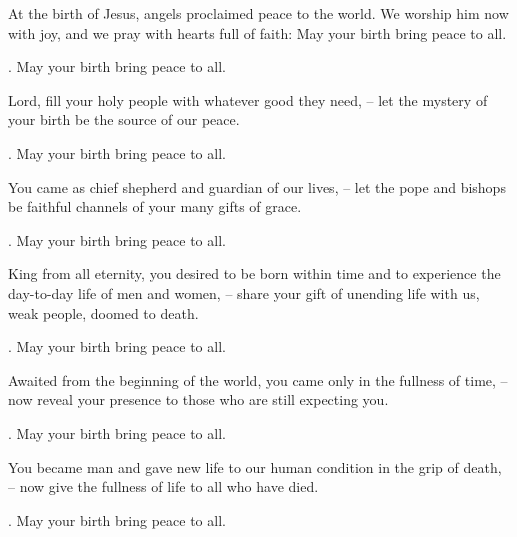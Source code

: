 \lettrine[loversize=0.15,lines=2]{A}{}t the birth of Jesus, angels proclaimed peace to the world. We worship him now with joy, and we pray with hearts full of faith: May your birth bring peace to all.
\par \Rbar. May your birth bring peace to all.

Lord, fill your holy people with whatever good they need,
– let the mystery of your birth be the source of our peace.
\par \Rbar. May your birth bring peace to all.

You came as chief shepherd and guardian of our lives,
– let the pope and bishops be faithful channels of your many gifts of grace.
\par \Rbar. May your birth bring peace to all.

King from all eternity, you desired to be born within time and to experience the day-to-day life of men and women,
– share your gift of unending life with us, weak people, doomed to death.
\par \Rbar. May your birth bring peace to all.

Awaited from the beginning of the world, you came only in the fullness of time,
– now reveal your presence to those who are still expecting you.
\par \Rbar. May your birth bring peace to all.

You became man and gave new life to our human condition in the grip of death,
– now give the fullness of life to all who have died.
\par \Rbar. May your birth bring peace to all.